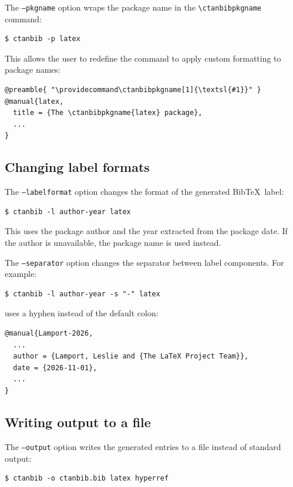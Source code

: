 \documentclass[11pt]{ltxdoc}
\begin{document}
The \texttt{--pkgname} option wraps the package name in the
\verb|\ctanbibpkgname| command:

\begin{verbatim}
$ ctanbib -p latex
\end{verbatim}

\noindent This allows the user to redefine the command to apply custom
formatting to package names:

\begin{verbatim}
@preamble{ "\providecommand\ctanbibpkgname[1]{\textsl{#1}}" }
@manual{latex,
  title = {The \ctanbibpkgname{latex} package},
  ...
}
\end{verbatim}

\subsection{Changing label formats}

The \texttt{--labelformat} option changes the format of the generated
Bib\TeX\ label:

\begin{verbatim}
$ ctanbib -l author-year latex
\end{verbatim}

\noindent This uses the package author and the year extracted from the
package date. If the author is unavailable, the package name is used
instead.

The \texttt{--separator} option changes the separator between label
components. For example:

\begin{verbatim}
$ ctanbib -l author-year -s "-" latex
\end{verbatim}

\noindent uses a hyphen instead of the default colon:

\begin{verbatim}
@manual{Lamport-2026,
  ...
  author = {Lamport, Leslie and {The LaTeX Project Team}},
  date = {2026-11-01},
  ...
}
\end{verbatim}

\subsection{Writing output to a file}

The \texttt{--output} option writes the generated entries to a file instead
of standard output:

\begin{verbatim}
$ ctanbib -o ctanbib.bib latex hyperref
\end{verbatim}
\end{document}
